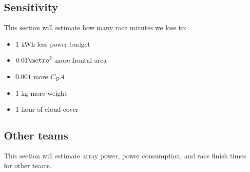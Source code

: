 \documentclass[letterpaper,12pt]{article}
\begin{document}
\subsection{Sensitivity}
This section will estimate how many race minutes we lose to: 
\begin{itemize}
\item 1 kWh less power budget
\item $0.01 \meter^2$ more frontal area
\item $0.001$ more $C_D A$
\item 1 kg more weight
\item 1 hour of cloud cover
\end{itemize}

\subsection{Other teams}
This section will estimate array power, power consumption, and race finish times for other teams.
\end{document}
